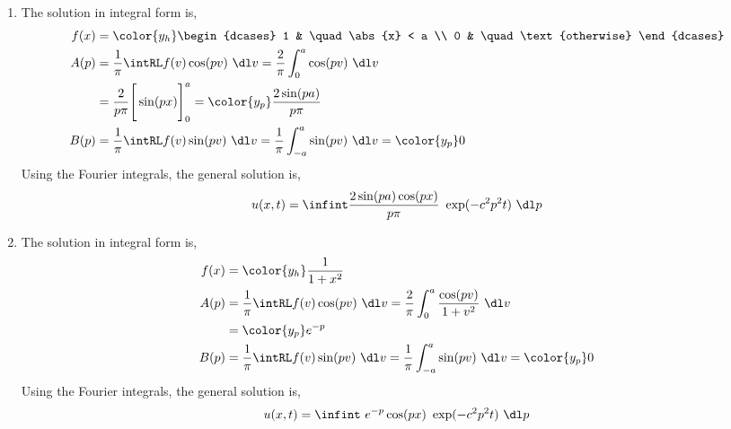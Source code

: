 \begin{enumerate}
    \item The solution in integral form is,
          \begin{align}
              f(x) & = \color{y_h} \begin{dcases}
                                       1 & \quad \abs{x} < a      \\
                                       0 & \quad \text{otherwise}
                                   \end{dcases}    \\
              A(p) & = \frac{1}{\pi} \intRL f(v) \cos(pv)\ \dl v
              = \frac{2}{\pi} \int_{0}^{a} \cos(pv)\ \dl v       \\
                   & = \frac{2}{p\pi} \Bigg[ \sin(px) \Bigg]_0^a
              = \color{y_p} \frac{2\sin(pa)}{p\pi}               \\
              B(p) & = \frac{1}{\pi} \intRL f(v) \sin(pv)\ \dl v
              = \frac{1}{\pi} \int_{-a}^{a} \sin(pv)\ \dl v
              = \color{y_p} 0
          \end{align}
          Using the Fourier integrals, the general solution is,
          \begin{align}
              u(x, t) = \infint \frac{2\sin(pa)\cos(px)}{p\pi}\ \exp(-c^2p^2 t)\ \dl p
          \end{align}

    \item The solution in integral form is,
          \begin{align}
              f(x) & = \color{y_h} \frac{1}{1 + x^2}                       \\
              A(p) & = \frac{1}{\pi} \intRL f(v) \cos(pv)\ \dl v
              = \frac{2}{\pi} \int_{0}^{a} \frac{\cos(pv)}{1 + v^2}\ \dl v \\
                   & = \color{y_p} e^{-p}                                  \\
              B(p) & = \frac{1}{\pi} \intRL f(v) \sin(pv)\ \dl v
              = \frac{1}{\pi} \int_{-a}^{a} \sin(pv)\ \dl v
              = \color{y_p} 0
          \end{align}
          Using the Fourier integrals, the general solution is,
          \begin{align}
              u(x, t) = \infint\ e^{-p}\cos(px)\ \exp(-c^2p^2 t)\ \dl p
          \end{align}


\end{enumerate}
